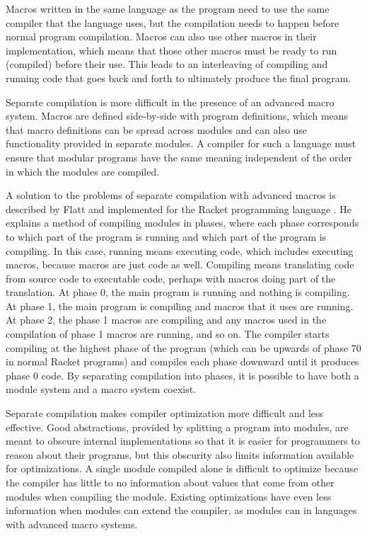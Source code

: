 Macros written in the same language as the program need to use the same compiler that the language uses, but the compilation needs to happen before normal program compilation.
Macros can also use other macros in their implementation, which means that those other macros must be ready to run (compiled) before their use.
This leads to an interleaving of compiling and running code that goes back and forth to ultimately produce the final program.

Separate compilation is more difficult in the presence of an advanced macro system.
Macros are defined side-by-side with program definitions, which means that macro definitions can be spread across modules and can also use functionality provided in separate modules.
A compiler for such a language must ensure that modular programs have the same meaning independent of the order in which the modules are compiled.

A solution to the problems of separate compilation with advanced macros is described by Flatt and implemented for the Racket programming language \cite{Flatt}.
He explains a method of compiling modules in phases, where each phase corresponds to which part of the program is running and which part of the program is compiling.
In this case, running means executing code, which includes executing macros, because macros are just code as well.
Compiling means translating code from source code to executable code, perhaps with macros doing part of the translation.
At phase 0, the main program is running and nothing is compiling.
At phase 1, the main program is compiling and macros that it uses are running.
At phase 2, the phase 1 macros are compiling and any macros used in the compilation of phase 1 macros are running, and so on.
The compiler starts compiling at the highest phase of the program (which can be upwards of phase 70 in normal Racket programs) and compiles each phase downward until it produces phase 0 code. 
By separating compilation into phases, it is possible to have both a module system and a macro system coexist.

Separate compilation makes compiler optimization more difficult and less effective.
Good abstractions, provided by splitting a program into modules, are meant to obscure internal implementations so that it is easier for programmers to reason about their programs, but this obscurity also limits information available for optimizations. 
A single module compiled alone is difficult to optimize because the compiler has little to no information about values that come from other modules when compiling the module.
Existing optimizations have even less information when modules can extend the compiler, as modules can in languages with advanced macro systems. 


